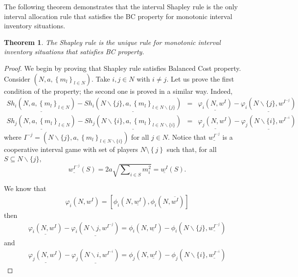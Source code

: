 \documentclass[12pt]{article}
\newtheorem{thm}{\sc Theorem}[section]
\begin{document}
The following theorem demonstrates that the interval Shapley rule is the only interval allocation rule that satisfies the BC property for monotonic interval inventory situations.

\begin{thm}
\label{th.2.} The Shapley rule is the unique rule for monotonic interval inventory
situations that satisfies BC property.
\end{thm}

\begin{proof}
We begin by proving that Shapley rule satisfies Balanced Cost property. Consider $\left( N,a,\left\{ m_{l}\right\} _{l\in N}\right)$. Take $i,j\in N$ with $i\neq j$. Let us prove the first condition of the property; the second one is proved in a similar way. Indeed, 
\begin{eqnarray*}
\underline{Sh_{i}\left( N,a,\left\{ m_{l}\right\} _{l\in N}\right)} -\underline{Sh_{i}\left( N\backslash\{j\},a,\left\{ m_{l}\right\} _{l\in N\backslash\{j\}}\right)} &=&\underline{\varphi
_{i}(N,w^I)}-\underline{\varphi _{i}(N\backslash\{j\} ,w^{I^{-j}})} 
\\
\underline{Sh_{j}\left( N,a,\left\{ m_{l}\right\} _{l\in N}\right)} -\underline{Sh_{j}\left( N\backslash\{i\},a,\left\{ m_{l}\right\} _{l\in N\backslash\{i\}}\right)} &=&\underline{\varphi
_{j}(N,w^{I})}-\underline{\varphi _{j}(N\backslash\{i\} ,w^{I^{-i}})} 
\end{eqnarray*}
where $I^{-j}=\left( N\backslash\{j\},a,\left\{ m_{l}\right\} _{l\in N\backslash\{i\}}\right)$ for all $j \in N$. Notice that $\underline{w^{I^{-j}}}$ is a cooperative interval game with set
of players $N\setminus \left\{ j\right\}$ such that, for all $S\subseteq
N\backslash\{j\}, $
\begin{equation*}
\underline{w^{I^{-j}}}\left( S\right) =2a\sqrt{\sum\nolimits_{i\in S}m_{i}^{2}}%
=\underline{w^{I}}\left( S\right).
\end{equation*}%

We know that 
\begin{eqnarray*}
\varphi _{i}(N,w^{I})=
\left[ \phi_{i} (N,\underline{w^{I}}),\phi_{i} (N,\overline{w^{I}})\right]
\end{eqnarray*}%
then
\begin{eqnarray*}
\underline{\varphi _{i}(N,w^{I})}-\underline{\varphi _{i}(N\backslash{j},w^{I^{-j}})} = 
 \phi_{i} (N,\underline{w^{I}})
- \phi_{i} (N\backslash\{j\} ,\underline{w^{I^{-j}}})
\end{eqnarray*}%
and
\begin{eqnarray*}
\underline{\varphi _{j}(N,w^{I})}-\underline{\varphi _{j}(N\backslash{i},w^{I^{-i}})} = \phi_{j} (N,\underline{w^{I}})
- \phi_{j} (N\backslash\{i\} ,\underline{w^{I^{-i}}})
\end{eqnarray*}%


\end{proof}
\end{document}
